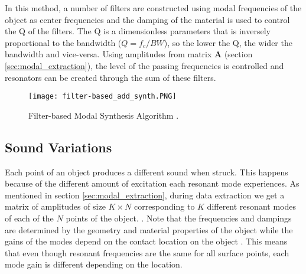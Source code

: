 In this method, a number of filters are constructed using modal frequencies of the object as center frequencies and the damping of the material is used to control the \gls{Q} of the filters.  The \gls{Q} is a dimensionless parameters that is inversely proportional to the bandwidth ($Q=f_c/BW$), so the lower the \gls{Q}, the wider the bandwidth and vice-versa. Using amplitudes from matrix \textbf{A} (section \ref{sec:modal_extraction}), the level of the passing frequencies is controlled and resonators can be created through the sum of these filters. 

\begin{figure}[H]
  \centering
    \texttt{[image: filter-based\_add\_synth.PNG]}
      \caption{Filter-based Modal Synthesis Algorithm \cite{Cook:2002:RSS:515316}.}
      \label{fig:filter_synth}
\end{figure}

\subsection{Sound Variations} \label{sec:sound_variation}
Each point of an object produces a different sound when struck. This happens because of the different amount of excitation each resonant mode experiences. As mentioned in section \ref{sec:modal_extraction}, during data extraction we get a matrix of amplitudes of size $K\times N$ corresponding to $K$ different resonant modes of each of the $N$ points of the object. . Note that the frequencies and dampings are determined by the geometry and material properties of the object while the gains of the modes depend on the contact location on the
object \cite{van2001foleyautomatic}. This means that even though resonant frequencies are the same for all surface points, each mode gain is different depending on the location.

